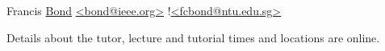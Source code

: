 \documentclass[headrule,footrule]{foils}
\begin{document}
\begin{description}\addtolength{\itemsep}{-5mm}
\item [Coordinator]  Francis \ul{Bond} 
{\small \url{<bond@ieee.org>} !\url{<fcbond@ntu.edu.sg>}}
\item Details about the tutor, lecture and tutorial times and
  locations are online.


\end{description}




\end{document}
